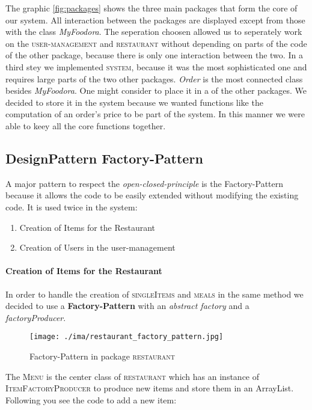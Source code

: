 The graphic \ref{fig:packages} shows the three main packages that form the core of our system. All
interaction between the packages are displayed except from those with the class \textit{MyFoodora}.
The seperation choosen allowed us to seperately work on the \textsc{user-management} and
\textsc{restaurant} without depending on parts of the code of the other package, because there is 
only one interaction between the two. In a third stey we implemented \textsc{system}, because it was
the most sophisticated one and requires large parts of the two other packages. \textit{Order}
is the most connected class besides \textit{MyFoodora}. One might consider to place it in a of the other 
packages. We decided to store it in the system because we wanted functions like the computation of 
an order's price to be part of the system. In this manner we were able to keey all the core functions
together. 

\subsection{DesignPattern Factory-Pattern}
\label{sub:designpattern_factory_pattern}

A major pattern to respect the \textit{open-closed-principle} is the Factory-Pattern because it
allows the code to be easily extended without modifying the existing code. It is used twice in the
system:
\begin{enumerate}
	\item Creation of Items for the Restaurant
	\item Creation of Users in the user-management
\end{enumerate}

\paragraph{Creation of Items for the Restaurant}

In order to handle the creation of \textsc{singleItems} and \textsc{meals} in the same method we 
decided to use a \textbf{Factory-Pattern} with an \textit{abstract factory} and a
\textit{factoryProducer}. 

\begin{figure}[H]
	\centering
	\texttt{[image: ./ima/restaurant\_factory\_pattern.jpg]}
	\caption{Factory-Pattern in package \textsc{restaurant}}
	\label{fig:restaurant-factory-pattern}
\end{figure}

The \textsc{Menu} is the center class of \textsc{restaurant} which has an instance of 
\textsc{ItemFactoryProducer} to produce new items and store them in an ArrayList. Following you see
the code to add a new item:

